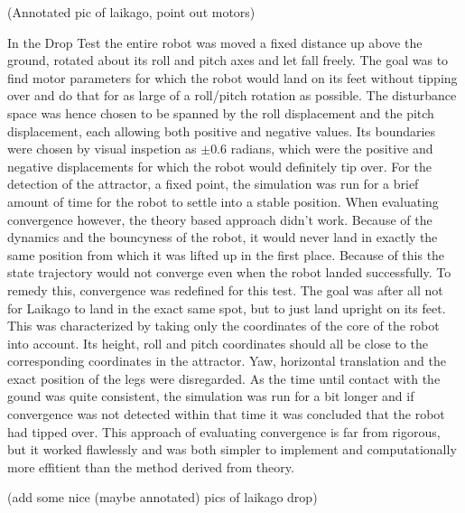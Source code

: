     (Annotated pic of laikago, point out motors)

    In the Drop Test the entire robot was moved a fixed distance up above the ground, rotated about its roll and pitch axes and let fall freely. The goal was to find motor parameters for which the robot would land on its feet without tipping over and do that for as large of a roll/pitch rotation as possible. The disturbance space was hence chosen to be spanned by the roll displacement and the pitch displacement, each allowing both positive and negative values. Its boundaries were chosen by visual inspetion as $\pm 0.6$ radians, which were the positive and negative displacements for which the robot would definitely tip over. For the detection of the attractor, a fixed point, the simulation was run for a brief amount of time for the robot to settle into a stable position. When evaluating convergence however, the theory based approach didn't work. Because of the dynamics and the bouncyness of the robot, it would never land in exactly the same position from which it was lifted up in the first place. Because of this the state trajectory would not converge even when the robot landed successfully. To remedy this, convergence was redefined for this test. The goal was after all not for Laikago to land in the exact same spot, but to just land upright on its feet. This was characterized by taking only the coordinates of the core of the robot into account. Its height, roll and pitch coordinates should all be close to the corresponding coordinates in the attractor. Yaw, horizontal translation and the exact position of the legs were disregarded.
    As the time until contact with the gound was quite consistent, the simulation was run for a bit longer and if convergence was not detected within that time it was concluded that the robot had tipped over. This approach of evaluating convergence is far from rigorous, but it worked flawlessly and was both simpler to implement and computationally more effitient than the method derived from theory. 

    (add some nice (maybe annotated) pics of laikago drop)

